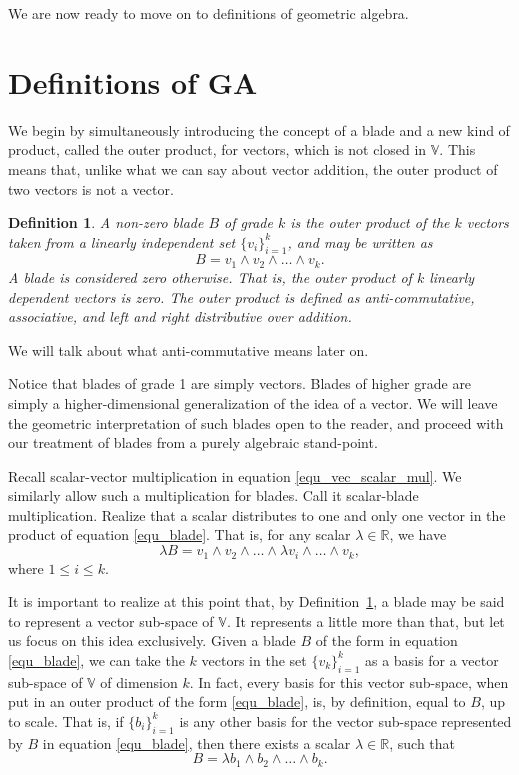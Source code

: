 \documentclass[12pt]{article}
\newcommand{\V}{\mathbb{V}}
\newcommand{\R}{\mathbb{R}}
\newtheorem{definition}{Definition}[section]
\begin{document}
We are now ready to move on to definitions of geometric algebra.

\section{Definitions of GA}

We begin by simultaneously introducing the concept of a blade and a new kind of
product, called the outer product, for vectors, which is not closed in $\V$.  This means
that, unlike what we can say about vector addition, the outer product of two vectors is not a vector.
\begin{definition}\label{def_blade}
A non-zero blade $B$ of grade $k$ is the outer product of the $k$ vectors taken
from a linearly independent set $\{v_i\}_{i=1}^k$, and may be written as
\begin{equation}\label{equ_blade}
B = v_1\wedge v_2\wedge\dots\wedge v_k.
\end{equation}
A blade is considered zero otherwise.  That is, the outer product of $k$
linearly dependent vectors is zero.  The outer product is defined as
anti-commutative, associative, and left and right distributive over addition.
\end{definition}

We will talk about what anti-commutative means later on.

Notice that blades of grade 1 are simply vectors.  Blades of higher grade are simply
a higher-dimensional generalization of the idea of a vector.  We will leave the geometric
interpretation of such blades open to the reader, and proceed with our treatment of
blades from a purely algebraic stand-point.

Recall scalar-vector multiplication in equation \eqref{equ_vec_scalar_mul}.
We similarly allow such a multiplication for blades.  Call it scalar-blade multiplication.
Realize that a scalar distributes to one and only one vector in the product of
equation \eqref{equ_blade}.  That is, for any scalar $\lambda\in\R$,
we have
\begin{equation}
\lambda B = v_1\wedge v_2\wedge\dots\wedge \lambda v_i\wedge\dots\wedge v_k,
\end{equation}
where $1\leq i\leq k$.

It is important to realize at this point that, by Definition~\ref{def_blade}, a blade
may be said to represent a vector sub-space of $\V$.  It represents a little more
than that, but let us focus on this idea exclusively.  Given a blade $B$ of the
form in equation \eqref{equ_blade}, we can take the $k$ vectors in the
set $\{v_k\}_{i=1}^k$ as a basis for a vector sub-space of $\V$ of
dimension $k$.  In fact, every basis for this vector sub-space, when put
in an outer product of the form \eqref{equ_blade}, is, by definition,
equal to $B$, up to scale.  That is, if $\{b_i\}_{i=1}^k$ is any other
basis for the vector sub-space represented by $B$ in equation \eqref{equ_blade},
then there exists a scalar $\lambda\in\R$, such that
\begin{equation}
B = \lambda b_1\wedge b_2\wedge\dots\wedge b_k.
\end{equation}
\end{document}
